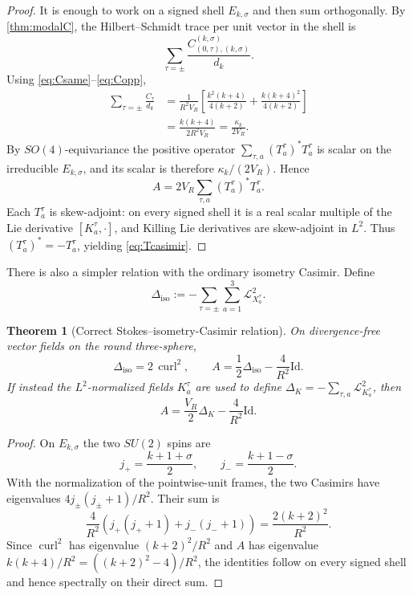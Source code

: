 \documentclass[
 aps,
 prd,
 reprint,
 amsmath,
 amssymb,
 nofootinbib,
 superscriptaddress
]{revtex4-2}
\newtheorem{theorem}{Theorem}[section]
\theoremstyle{definition}
\theoremstyle{remark}
\newcommand{\curl}{\operatorname{curl}}
\newcommand{\Id}{\mathrm{Id}}
\begin{document}
\begin{proof}
It is enough to work on a signed shell $E_{k,\sigma}$ and then sum
orthogonally.  By \cref{thm:modalC}, the Hilbert--Schmidt trace per unit
vector in the shell is
\[
 \sum_{\tau=\pm}\frac{
 C_{(0,\tau),(k,\sigma)}^{(k,\sigma)}
 }{d_k}.
\]
Using \eqref{eq:Csame}--\eqref{eq:Copp},
\[
\begin{aligned}
 \sum_{\tau=\pm}\frac{C_\tau}{d_k}
 &=
 \frac{1}{R^2V_R}
 \left[
 \frac{k^2(k+4)}{4(k+2)}
 +
 \frac{k(k+4)^2}{4(k+2)}
 \right]\\
 &=
 \frac{k(k+4)}{2R^2V_R}
 =
 \frac{\kappa_k}{2V_R}.
\end{aligned}
\]
By $SO(4)$-equivariance the positive operator
$\sum_{\tau,a}(T_a^\tau)^*T_a^\tau$ is scalar on the irreducible
$E_{k,\sigma}$, and its scalar is therefore $\kappa_k/(2V_R)$.
Hence
\[
 A=2V_R\sum_{\tau,a}(T_a^\tau)^*T_a^\tau.
\]
Each $T_a^\tau$ is skew-adjoint: on every signed shell it is a real scalar
multiple of the Lie derivative $[K_a^\tau,\cdot]$, and Killing Lie
derivatives are skew-adjoint in $L^2$.  Thus
$(T_a^\tau)^*=-T_a^\tau$, yielding \eqref{eq:Tcasimir}.
\end{proof}

There is also a simpler relation with the ordinary isometry Casimir.
Define
\begin{equation}
 \Delta_{\mathrm{iso}}
 :=
 -\sum_{\tau=\pm}\sum_{a=1}^3
 \mathcal L_{X_a^\tau}^2.
 \label{eq:Diso}
\end{equation}

\begin{theorem}[Correct Stokes--isometry-Casimir relation]
\label{thm:stokesiso}
On divergence-free vector fields on the round three-sphere,
\begin{equation}
 \boxed{
 \Delta_{\mathrm{iso}}=2\,\curl^2,
 \qquad
 A=\frac12\Delta_{\mathrm{iso}}-\frac{4}{R^2}\Id.
 }
 \label{eq:stokesiso}
\end{equation}
If instead the $L^2$-normalized fields $K_a^\tau$ are used to define
$\Delta_K=-\sum_{\tau,a}\mathcal L_{K_a^\tau}^2$, then
\begin{equation}
 \boxed{
 A=\frac{V_R}{2}\Delta_K-\frac{4}{R^2}\Id.
 }
 \label{eq:stokesisoL2}
\end{equation}
\end{theorem}

\begin{proof}
On $E_{k,\sigma}$ the two $SU(2)$ spins are
\[
 j_+=\frac{k+1+\sigma}{2},
 \qquad
 j_-=\frac{k+1-\sigma}{2}.
\]
With the normalization of the pointwise-unit frames, the two Casimirs have
eigenvalues $4j_\pm(j_\pm+1)/R^2$.  Their sum is
\[
 \frac4{R^2}
 \left(j_+(j_++1)+j_-(j_-+1)\right)
 =
 \frac{2(k+2)^2}{R^2}.
\]
Since $\curl^2$ has eigenvalue $(k+2)^2/R^2$ and
$A$ has eigenvalue $k(k+4)/R^2=((k+2)^2-4)/R^2$, the identities follow
on every signed shell and hence spectrally on their direct sum.
\end{proof}
\end{document}
